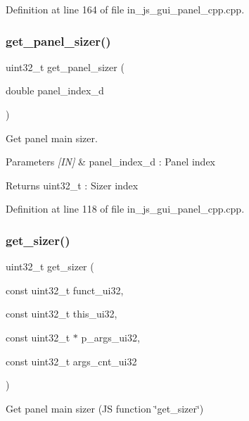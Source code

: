 Definition at line 164 of file in\+\_\+js\+\_\+gui\+\_\+panel\+\_\+cpp.\+cpp.

\mbox{\label{group___panel_gae7793b79ca78e3750f183921a0cdbf7f}} 
\subsubsection{get\_panel\_sizer()}
{\footnotesize\ttfamily uint32\+\_\+t get\+\_\+panel\+\_\+sizer (\begin{DoxyParamCaption}\item[{double}]{panel\+\_\+index\+\_\+d }\end{DoxyParamCaption})}



Get panel main sizer. 


\begin{DoxyParams}{Parameters}
{\em \mbox{[}\+I\+N\mbox{]}} & panel\+\_\+index\+\_\+d \+: Panel index \\
\hline
\end{DoxyParams}
\begin{DoxyReturn}{Returns}
uint32\+\_\+t \+: Sizer index 
\end{DoxyReturn}


Definition at line 118 of file in\+\_\+js\+\_\+gui\+\_\+panel\+\_\+cpp.\+cpp.

\mbox{\label{group___panel_gad9a078f6234681b96bba71f9a09df0e6}} 
\subsubsection{get\_sizer()}
{\footnotesize\ttfamily uint32\+\_\+t get\+\_\+sizer (\begin{DoxyParamCaption}\item[{const uint32\+\_\+t}]{funct\+\_\+ui32,  }\item[{const uint32\+\_\+t}]{this\+\_\+ui32,  }\item[{const uint32\+\_\+t $\ast$}]{p\+\_\+args\+\_\+ui32,  }\item[{const uint32\+\_\+t}]{args\+\_\+cnt\+\_\+ui32 }\end{DoxyParamCaption})\hspace{0.3cm}{\ttfamily [static]}}



Get panel main sizer (JS function \char`\"{}get\+\_\+sizer\char`\"{}) 


